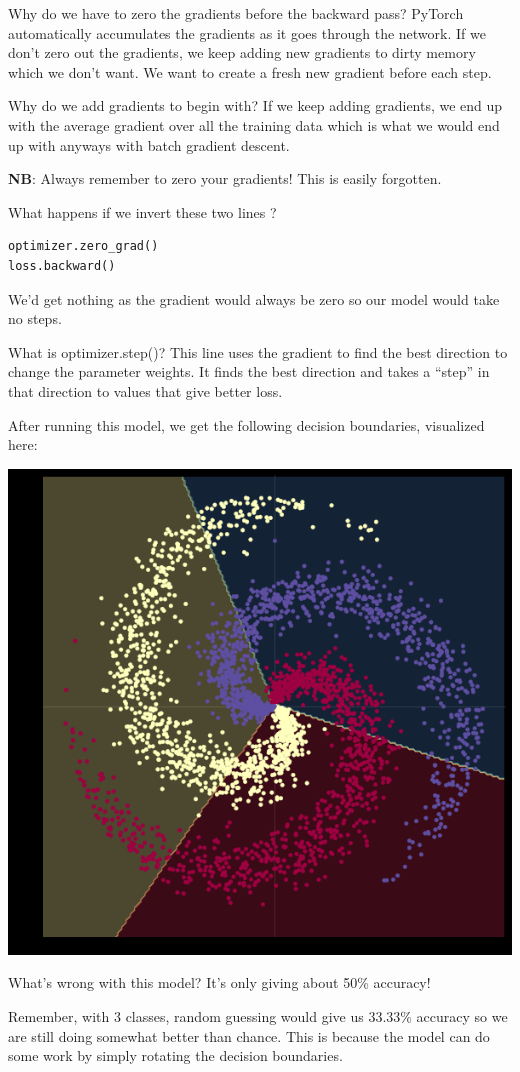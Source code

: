 Why do we have to zero the gradients before the backward pass? 
PyTorch automatically accumulates the gradients as it goes through the network. 
If we don't zero out the gradients, we keep adding new gradients to dirty memory which we don't want. 
We want to create a fresh new gradient before each step. 

Why do we add gradients to begin with? 
If we keep adding gradients, we end up with the average gradient over all the training data which is what we would end up with anyways with batch gradient descent.

\textbf{NB}: Always remember to zero your gradients! This is easily forgotten. 

What happens if we invert these two lines ? 

\begin{verbatim}
optimizer.zero_grad()
loss.backward()
\end{verbatim}

We'd get nothing as the gradient would always be zero so our model would take no steps. 

What is optimizer.step()? 
This line uses the gradient to find the best direction to change the parameter weights. 
It finds the best direction and takes a ``step'' in that direction to values that give better loss. 

After running this model, we get the following decision boundaries, visualized here:

\begin{center}
	\includegraphics[width=0.5\linewidth]{lectures/03-a/images/linear.png}
\end{center}

What's wrong with this model? 
It's only giving about 50\% accuracy!

Remember, with 3 classes, random guessing would give us 33.33\% accuracy so we are still doing somewhat better than chance. 
This is because the model can do some work by simply rotating the decision boundaries. 

